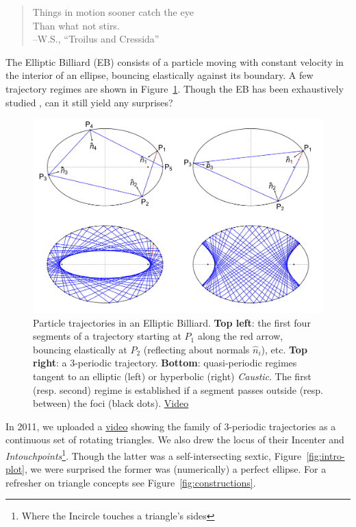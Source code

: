 \begin{quote}
Things in motion sooner catch the eye\\
Than what not stirs.\\
--W.S., ``Troilus and Cressida'' 
\end{quote}

The Elliptic Billiard (EB) consists of a particle moving with constant velocity in the interior of an ellipse, bouncing elastically against its boundary. A few trajectory regimes are shown in Figure~\ref{fig:billiard-trajectories}. Though the EB has been exhaustively studied \cite{dragovic11,sergei91}, can it still yield any surprises?

\begin{figure}
    \centering
    \includegraphics[width=\textwidth]{pics/u1000_billiard_trajectories.pdf}
    \caption{Particle trajectories in an Elliptic Billiard. \textbf{Top left}: the first four segments of a trajectory starting at $P_1$ along the red arrow, bouncing elastically at $P_2$ (reflecting about normals $\hat{n}_i$), etc. \textbf{Top right}: a 3-periodic trajectory. \textbf{Bottom}: quasi-periodic regimes tangent to an elliptic (left) or hyperbolic (right) {\em Caustic}. The first (resp. second) regime is established if a segment passes outside (resp. between) the foci (black dots).
    \href{https://youtu.be/A7mPzrNJHkA}{Video} \cite[pl\#1]{dsr_math_intell_playlist}}
    \label{fig:billiard-trajectories}
\end{figure}

In 2011, we uploaded a
\href{https://www.youtube.com/watch?v=9xU6T7hQMzs}{video} \cite[pl\#2]{dsr_math_intell_playlist} showing the family of 3-periodic trajectories as a continuous set of rotating triangles. We also drew the locus of their Incenter and {\em Intouchpoints}\footnote{Where the Incircle touches a triangle's sides}. Though the latter was a self-intersecting sextic, Figure~\ref{fig:intro-plot}, we were surprised the former was (numerically) a perfect ellipse. For a refresher on triangle concepts see Figure~\ref{fig:constructions}. 


